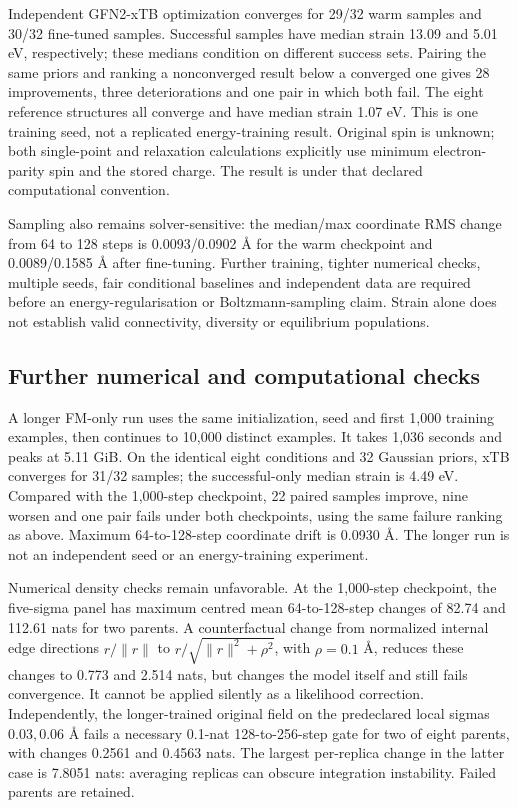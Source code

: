Independent GFN2-xTB optimization converges for 29/32 warm samples and 30/32 fine-tuned samples.
Successful samples have median strain 13.09 and 5.01 eV, respectively; these medians condition on
different success sets. Pairing the same priors and ranking a nonconverged result below a
converged one gives 28 improvements, three deteriorations and one pair in which both fail.
The eight reference structures all converge and have median strain 1.07 eV. This is one
training seed, not a replicated energy-training result. Original spin is unknown; both
single-point and relaxation calculations explicitly use minimum electron-parity spin and the
stored charge. The result is under that declared computational convention.

Sampling also remains solver-sensitive: the median/max coordinate RMS change from 64 to 128
steps is 0.0093/0.0902 \AA{} for the warm checkpoint and 0.0089/0.1585 \AA{} after fine-tuning.
Further training, tighter numerical checks, multiple seeds, fair conditional baselines and
independent data are required before an energy-regularisation or Boltzmann-sampling claim.
Strain alone does not establish valid connectivity, diversity or equilibrium populations.

\subsection{Further numerical and computational checks}

A longer FM-only run uses the same initialization, seed and first 1,000 training examples,
then continues to 10,000 distinct examples. It takes 1,036 seconds and peaks at 5.11 GiB.
On the identical eight conditions and 32 Gaussian priors, xTB converges for 31/32 samples;
the successful-only median strain is 4.49 eV. Compared with the 1,000-step checkpoint,
22 paired samples improve, nine worsen and one pair fails under both checkpoints, using
the same failure ranking as above. Maximum 64-to-128-step coordinate drift is 0.0930 \AA.
The longer run is not an independent seed or an energy-training experiment.

Numerical density checks remain unfavorable. At the 1,000-step checkpoint, the five-sigma
panel has maximum centred mean 64-to-128-step changes of 82.74 and 112.61 nats for two
parents. A counterfactual change from normalized internal edge directions $r/\|r\|$ to
$r/\sqrt{\|r\|^2+\rho^2}$, with $\rho=0.1$ \AA, reduces these changes to 0.773 and 2.514
nats, but changes the model itself and still fails convergence. It cannot be applied
silently as a likelihood correction. Independently, the longer-trained original field
on the predeclared local sigmas $0.03,0.06$ \AA{} fails a necessary 0.1-nat 128-to-256-step
gate for two of eight parents, with changes 0.2561 and 0.4563 nats. The largest
per-replica change in the latter case is 7.8051 nats: averaging replicas can obscure
integration instability. Failed parents are retained.

